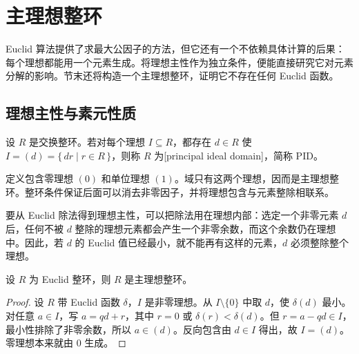 
\section{主理想整环}
\label{b1:sec:1103}

%
%

Euclid 算法提供了求最大公因子的方法，但它还有一个不依赖具体计算的后果：每个理想都能用一个元素生成。将理想主性作为独立条件，便能直接研究它对元素分解的影响。节末还将构造一个主理想整环，证明它不存在任何 Euclid 函数。

\subsection{理想主性与素元性质}
\label{b1:subsec:1103:01}

\begin{definition}\label{b1:def:pid}
	设 \(R\) 是交换整环。若对每个理想 \(I\subseteq R\)，都存在 \(d\in R\) 使 \(I=(d)=\{\,dr\mid r\in R\,\}\)，则称 \(R\) 为[principal ideal domain]，简称 PID。
\end{definition}

定义包含零理想 \((0)\) 和单位理想 \((1)\)。域只有这两个理想，因而是主理想整环。整环条件保证后面可以消去非零因子，并将理想包含与元素整除相联系。

\ProseParagraphBreak
要从 Euclid 除法得到理想主性，可以把除法用在理想内部：选定一个非零元素 \(d\) 后，任何不被 \(d\) 整除的理想元素都会产生一个非零余数，而这个余数仍在理想中。因此，若 \(d\) 的 Euclid 值已经最小，就不能再有这样的元素，\(d\) 必须整除整个理想。

\begin{theorem}\label{b1:thm:euclidean-pid}
	设 \(R\) 为 Euclid 整环，则 \(R\) 是主理想整环。
\end{theorem}
\begin{proof}
	设 \(R\) 带 Euclid 函数 \(\delta\)，\(I\) 是非零理想。从 \(I\setminus\{0\}\) 中取 \(d\)，使 \(\delta(d)\) 最小。对任意 \(a\in I\)，写 \(a=qd+r\)，其中 \(r=0\) 或 \(\delta(r)<\delta(d)\)。但 \(r=a-qd\in I\)，最小性排除了非零余数，所以 \(a\in(d)\)。反向包含由 \(d\in I\) 得出，故 \(I=(d)\)。零理想本来就由 \(0\) 生成。
\end{proof}

